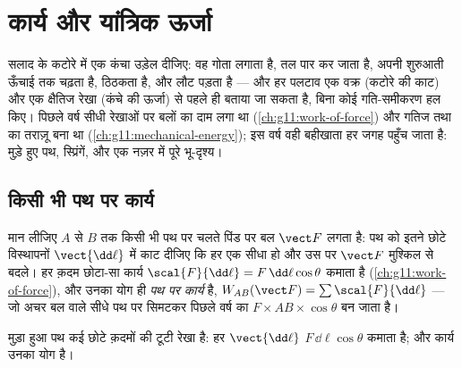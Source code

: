 \chapter{कार्य और यांत्रिक ऊर्जा}\label{ch:g12:work-and-energy}

सलाद के कटोरे में एक कंचा उड़ेल दीजिए: वह गोता लगाता है, तल पार कर जाता है,
अपनी शुरुआती ऊँचाई तक चढ़ता है, ठिठकता है, और लौट पड़ता है --- और हर पलटाव एक
वक्र (कटोरे की काट) और एक क्षैतिज रेखा (कंचे की ऊर्जा) से पहले ही बताया
जा सकता है, बिना कोई गति-समीकरण हल किए। पिछले वर्ष सीधी रेखाओं पर बलों
का दाम लगा था (\cref{ch:g11:work-of-force}) और गतिज तथा  का तराज़ू बना था
(\cref{ch:g11:mechanical-energy}); इस वर्ष वही बहीखाता हर जगह पहुँच जाता है: मुड़े हुए पथ, स्प्रिंगें,
और एक नज़र में पूरे भू-दृश्य।

\section{किसी भी पथ पर कार्य}

\begin{definition}[पथ पर कार्य]\label{def:g12:work-and-energy:path}
मान लीजिए $A$ से $B$ तक किसी भी पथ पर चलते पिंड पर बल $\vect F$ लगता
है: पथ को इतने छोटे विस्थापनों $\vect{\dd\ell}$ में काट दीजिए कि हर एक सीधा हो और उस पर
$\vect F$ मुश्किल से बदले। हर क़दम छोटा-सा कार्य $\scal{F}{\dd\ell} = F\,\dd\ell\cos\theta$ कमाता है (\cref{ch:g11:work-of-force}),
और उनका योग ही \emph{पथ पर कार्य} है, $W_{AB}(\vect F) = \sum \scal{F}{\dd\ell}$ ---
जो अचर बल वाले सीधे पथ पर सिमटकर पिछले वर्ष का $F \times AB \times \cos\theta$ बन जाता है।
\end{definition}

\begin{omfigure}

{\small मुड़ा हुआ पथ कई छोटे क़दमों की टूटी रेखा है: हर $\vect{\dd\ell}$ $F\,\dd\ell\cos\theta$ कमाता है;
और कार्य उनका योग है।}
\end{omfigure}


